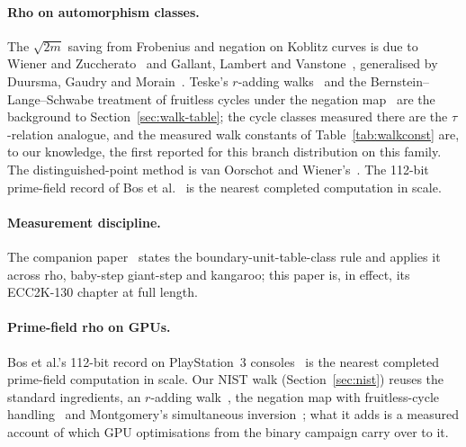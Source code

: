 \paragraph{Rho on automorphism classes.} The $\sqrt{2m}$ saving from
Frobenius and negation on Koblitz curves is due to Wiener and
Zuccherato~\cite{wienerzuccherato1998} and Gallant, Lambert and
Vanstone~\cite{glv2000}, generalised by Duursma, Gaudry and
Morain~\cite{duursma1999}. Teske's $r$-adding walks~\cite{teske2001}
and the Bernstein--Lange--Schwabe treatment of fruitless cycles under
the negation map~\cite{bls2011} are the background to
Section~\ref{sec:walk-table}; the cycle classes measured there are the
$\tau$-relation analogue, and the measured walk constants of
Table~\ref{tab:walkconst} are, to our knowledge, the first reported
for this branch distribution on this family. The distinguished-point
method is van Oorschot and Wiener's~\cite{vanoorschot1999}. The 112-bit
prime-field record of Bos et al.~\cite{bos2012ps3} is the nearest
completed computation in scale.

\paragraph{Measurement discipline.} The companion
paper~\cite{ecdlppaper} states the boundary-unit-table-class rule and
applies it across rho, baby-step giant-step and kangaroo; this paper is, in effect, its ECC2K-130 chapter at
full length.

\paragraph{Prime-field rho on GPUs.} Bos et al.'s 112-bit record on
PlayStation~3 consoles~\cite{bos2012ps3} is the nearest completed
prime-field computation in scale. Our NIST walk (Section~\ref{sec:nist})
reuses the standard ingredients, an $r$-adding walk~\cite{teske2001},
the negation map with fruitless-cycle handling~\cite{bls2011} and
Montgomery's simultaneous inversion~\cite{montgomery1987}; what it adds
is a measured account of which GPU optimisations from the binary
campaign carry over to it.
